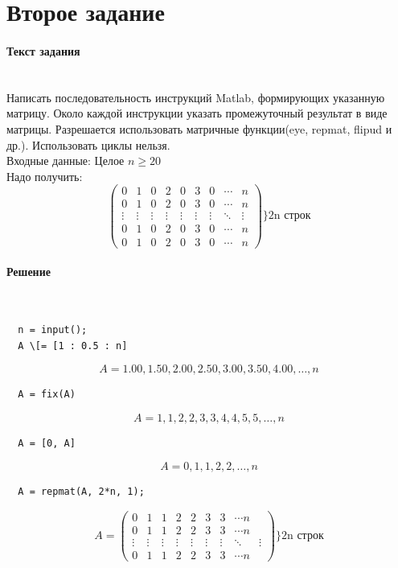\section{Второе задание}

\paragraph{Текст задания} ~\\
Написать последовательность инструкций Matlab, формирующих указанную матрицу. Около каждой инструкции указать промежуточный результат в виде матрицы. Разрешается использовать матричные функции(eye, repmat, flipud и др.). Использовать циклы нельзя.\\[1em]
Входные данные: Целое $n \geq 20$\\[1em]
Надо получить:
\[
  \begin{pmatrix}
    0 & 1 & 0 & 2 & 0 & 3 & 0 & \cdots & n \\
    0 & 1 & 0 & 2 & 0 & 3 & 0 & \cdots & n \\
    \vdots & \vdots & \vdots & \vdots & \vdots & \vdots & \vdots & \ddots & \vdots \\
    0 & 1 & 0 & 2 & 0 & 3 & 0 & \cdots & n \\
    0 & 1 & 0 & 2 & 0 & 3 & 0 & \cdots & n
  \end{pmatrix}
  \} \text{2n строк}
\]

\paragraph{Решение} ~\\
\begin{lstlisting}
  n = input();
  A \[= [1 : 0.5 : n]
  \end{lstlisting}
\[A = 1.00, 1.50, 2.00, 2.50, 3.00, 3.50, 4.00, \ldots, n\]

\begin{lstlisting}
  A = fix(A)
\end{lstlisting}
\[A = 1, 1, 2, 2, 3, 3, 4, 4, 5, 5, \ldots, n\]

\begin{lstlisting}
  A = [0, A]
\end{lstlisting}
\[A = 0, 1, 1, 2, 2, \ldots, n\]

\begin{lstlisting}
  A = repmat(A, 2*n, 1);
\end{lstlisting}
\[
  A =
  \begin{pmatrix}
    0 & 1 & 1 & 2 & 2 & 3 & 3 & \cdots n \\
    0 & 1 & 1 & 2 & 2 & 3 & 3 & \cdots n \\
    \vdots & \vdots & \vdots & \vdots & \vdots & \vdots & \vdots & \ddots & \vdots \\
    0 & 1 & 1 & 2 & 2 & 3 & 3 & \cdots n
  \end{pmatrix}
  \} \text{2n строк}
\]

